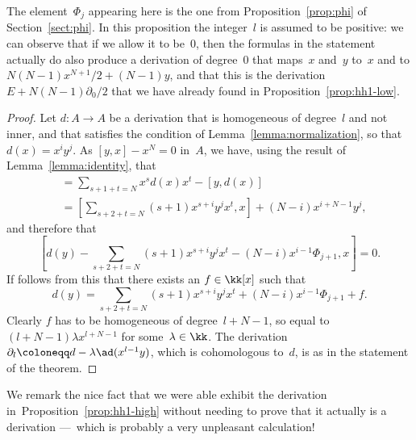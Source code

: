 The element~$\Phi_j$ appearing here is the one from
Proposition~\ref{prop:phi} of Section~\ref{sect:phi}. In this proposition
the integer~$l$ is assumed to be positive: we can observe that if we allow
it to be~$0$, then the formulas in the statement actually do also produce a
derivation of degree~$0$ that maps~$x$ and~$y$ to~$x$ and to
$N(N-1)x^{N+1}/2+(N-1)y$, and that this is the derivation
$E+N(N-1)\partial_0/2$ that we have already found in
Proposition~\ref{prop:hh1-low}.

\begin{proof}
Let $d:A\to A$ be a derivation that is homogeneous of degree~$l$
and not inner, and that satisfies the condition of
Lemma~\ref{lemma:normalization}, so that $d(x)=x^iy^j$. As $[y,x]-x^N=0$
in~$A$, we have, using the result of Lemma~\ref{lemma:identity}, that
  \begin{align}
  [d(y),x] 
        &= \sum_{s+1+t=N}x^sd(x)x^t - [y,d(x)]  \\
        &= \left[
           \sum_{s+2+t=N}(s+1)x^{s+i}y^jx^t,x
           \right] 
           + (N-i)x^{i+N-1}y^j,
  \end{align}
and therefore that
  \[
  \left[
  d(y) - \sum_{s+2+t=N}(s+1)x^{s+i}y^jx^t - (N-i)x^{i-1}\Phi_{j+1},
  x
  \right]
  = 0.
  \]
If follows from this that there exists an $f\in\kk[x]$ such that
  \[
  d(y) = \sum_{s+2+t=N}(s+1)x^{s+i}y^jx^t + (N-i)x^{i-1}\Phi_{j+1}+ f.
  \]
Clearly $f$ has to be homogeneous of degree~$l+N-1$, so equal to
$(l+N-1)\lambda x^{l+N-1}$ for some~$\lambda\in\kk$. The derivation
$\partial_l\coloneqq d-\lambda\ad(x^{l-1}y)$, which is cohomologous to~$d$,
is as in the statement of the theorem.
\end{proof}

We remark the nice fact that we were able exhibit the derivation
in~Proposition~\ref{prop:hh1-high} without needing to prove that it
actually is a derivation ---~which is probably a very unpleasant
calculation! 
